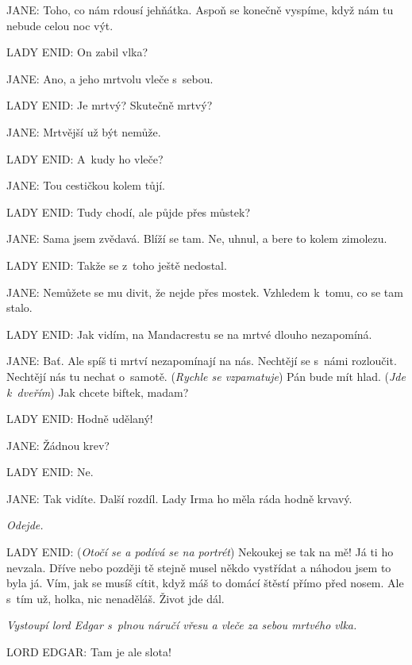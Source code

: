 \noindent
JANE: Toho, co nám rdousí jehňátka. Aspoň se konečně vyspíme, když nám tu nebude celou noc výt.

\noindent
LADY ENID: On zabil vlka?

\noindent
JANE: Ano, a jeho mrtvolu vleče s sebou.

\noindent
LADY ENID: Je mrtvý? Skutečně mrtvý?

\noindent
JANE: Mrtvější už být nemůže.

\noindent
LADY ENID: A~kudy ho vleče?

\noindent
JANE: Tou cestičkou kolem tůjí.

\noindent
LADY ENID: Tudy chodí, ale půjde přes můstek?

\noindent
JANE: Sama jsem zvědavá. Blíží se tam. Ne, uhnul, a bere to kolem zimolezu.

\noindent
LADY ENID: Takže se z toho ještě nedostal.

\noindent
JANE: Nemůžete se mu divit, že nejde přes mostek. Vzhledem k tomu, co se tam stalo.

\noindent
LADY ENID: Jak vidím, na Mandacrestu se na mrtvé dlouho nezapomíná.

\noindent
JANE: Bať. Ale spíš ti mrtví nezapomínají na nás. Nechtějí se s námi rozloučit. Nechtějí nás tu nechat o~samotě. (\textit{Rychle se vzpamatuje}) Pán bude mít hlad. (\textit{Jde k dveřím}) Jak chcete biftek, madam?

\noindent
LADY ENID: Hodně udělaný!

\noindent
JANE: Žádnou krev?

\noindent
LADY ENID: Ne.

\noindent
JANE: Tak vidíte. Další rozdíl. Lady Irma ho měla ráda hodně krvavý.

\smallskip
\noindent
\textit{Odejde.}

\smallskip

\noindent
LADY ENID: (\textit{Otočí se a podívá se na portrét}) Nekoukej se tak na mě! Já ti ho nevzala. Dříve nebo později tě stejně musel někdo vystřídat a náhodou jsem to byla já. Vím, jak se musíš cítit, když máš to domácí štěstí přímo před nosem. Ale s tím už, holka, nic nenaděláš. Život jde dál.

\smallskip

\noindent
\textit{Vystoupí lord Edgar s plnou náručí vřesu a vleče za sebou mrtvého vlka.}

\smallskip

\noindent
LORD EDGAR: Tam je ale slota!

